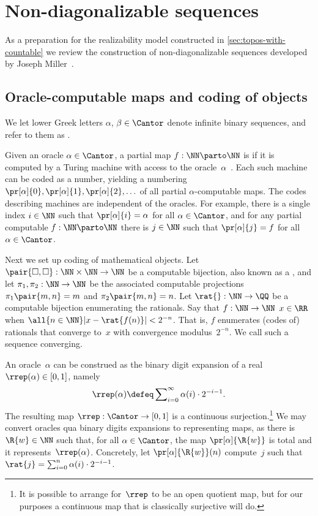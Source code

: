 \section{Non-diagonalizable sequences}
\label{sec:non-diag-sequ}

As a preparation for the realizability model constructed in \cref{sec:topos-with-countable} we review the construction of non-diagonalizable sequences developed by Joseph Miller~\cite{miller04:_cont_deg}.

\subsection{Oracle-computable maps and coding of objects}
\label{sec:oracle-comp-maps}

We let lower Greek letters $\alpha$, $\beta \in \Cantor$ denote infinite binary sequences, and refer to them as .

Given an oracle $\alpha \in \Cantor$, a partial map $f : \NN \parto \NN$ is  if it is computed by a Turing machine with access to the oracle~$\alpha$~\cite[Sect.~9.2]{rogers67:_theor_recur_funct_effec_comput}. Each such machine can be coded as a number, yielding a numbering $\pr[\alpha]{0}, \pr[\alpha]{1}, \pr[\alpha]{2}, \ldots$ of all partial $\alpha$-computable maps.
%
The codes describing machines are independent of the oracles. For example, there is a single index $i \in \NN$ such that $\pr[\alpha]{i} = \alpha$ for all $\alpha \in \Cantor$, and for any partial computable $f : \NN \parto \NN$ there is $j \in \NN$ such that $\pr[\alpha]{j} = f$ for all $\alpha \in \Cantor$.

Next we set up coding of mathematical objects.
%
Let $\pair{\Box, \Box} : \NN \times \NN \to \NN$ be a computable bijection, also known as a ,
and let $\pi_1, \pi_2 : \NN \to \NN$ be the associated computable projections $\pi_1 \pair{m, n} = m$ and $\pi_2 \pair{m, n} = n$.
%
Let $\rat{} : \NN \to \QQ$ be a computable bijection enumerating the rationals.
%
Say that $f : \NN \to \NN$  $x \in \RR$ when
%
$\all{n \in \NN} |x - \rat{f(n)}| < 2^{-n}$.
%
That is, $f$ enumerates (codes of) rationals that converge to~$x$ with convergence modulus~$2^{-n}$. We call such a sequence  converging.

An oracle~$\alpha$ can be construed as the binary digit expansion of a real $\rrep(\alpha) \in [0,1]$, namely
%
\begin{equation*}
  \rrep(\alpha) \defeq \sum\nolimits_{i=0}^\infty \alpha(i) \cdot 2^{-i-1}.
\end{equation*}
%
The resulting map $\rrep : \Cantor \to [0,1]$ is a continuous surjection.\footnote{It is possible to arrange for~$\rrep$ to be an open quotient map, but for our purposes a continuous map that is classically surjective will do.}
%
We may convert oracles qua binary digits expansions to representing maps, as there is $\R{w} \in \NN$ such that, for all $\alpha \in \Cantor$, the map $\pr[\alpha]{\R{w}}$ is total and it represents~$\rrep(\alpha)$. Concretely, let $\pr[\alpha]{\R{w}}(n)$ compute~$j$ such that $\rat{j} = \sum\nolimits_{i=0}^{n} \alpha(i) \cdot 2^{-i-1}$.

